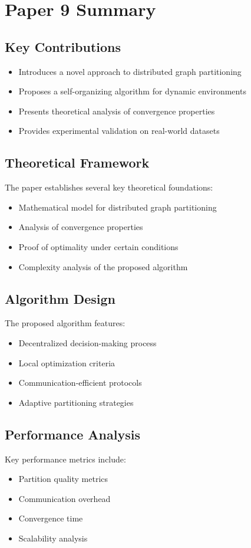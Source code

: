 \section{Paper 9 Summary}

\subsection{Key Contributions}
\begin{itemize}
    \item Introduces a novel approach to distributed graph partitioning
    \item Proposes a self-organizing algorithm for dynamic environments
    \item Presents theoretical analysis of convergence properties
    \item Provides experimental validation on real-world datasets
\end{itemize}

\subsection{Theoretical Framework}
The paper establishes several key theoretical foundations:
\begin{itemize}
    \item Mathematical model for distributed graph partitioning
    \item Analysis of convergence properties
    \item Proof of optimality under certain conditions
    \item Complexity analysis of the proposed algorithm
\end{itemize}

\subsection{Algorithm Design}
The proposed algorithm features:
\begin{itemize}
    \item Decentralized decision-making process
    \item Local optimization criteria
    \item Communication-efficient protocols
    \item Adaptive partitioning strategies
\end{itemize}

\subsection{Performance Analysis}
Key performance metrics include:
\begin{itemize}
    \item Partition quality metrics
    \item Communication overhead
    \item Convergence time
    \item Scalability analysis
\end{itemize}

